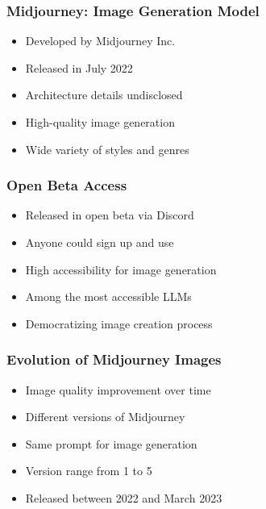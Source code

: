 \begin{frame}[fragile]\frametitle{Midjourney: Image Generation Model}
    
    \begin{itemize}
        \item Developed by Midjourney Inc.
        \item Released in July 2022
        \item Architecture details undisclosed
        \item High-quality image generation
        \item Wide variety of styles and genres
    \end{itemize}
	
\end{frame}

\begin{frame}[fragile]\frametitle{Open Beta Access}
    
    \begin{itemize}
        \item Released in open beta via Discord
        \item Anyone could sign up and use
        \item High accessibility for image generation
        \item Among the most accessible LLMs
        \item Democratizing image creation process
    \end{itemize}
\end{frame}

\begin{frame}[fragile]\frametitle{Evolution of Midjourney Images}
    
    \begin{itemize}
        \item Image quality improvement over time
        \item Different versions of Midjourney
        \item Same prompt for image generation
        \item Version range from 1 to 5
        \item Released between 2022 and March 2023
    \end{itemize}
\end{frame}

